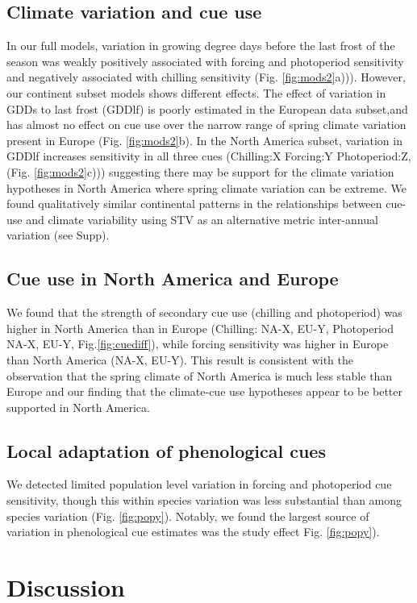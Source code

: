 \documentclass[12pt]{article}\usepackage[]{graphicx}\usepackage[]{color}
\begin{document}
\subsection*{Climate variation and cue use}
In our full models, variation in growing degree days before the last frost of the season was weakly positively associated with forcing and photoperiod sensitivity and negatively associated with chilling sensitivity (Fig. \ref{fig:mods2}a))). However, our continent subset models shows different effects. The effect of variation in GDDs to last frost (GDDlf) is poorly estimated in the European data subset,and has almost no effect on cue use over the narrow range of spring climate variation present in Europe  (Fig. \ref{fig:mods2}b). In the North America subset, variation in GDDlf increases sensitivity in all three cues (Chilling:X Forcing:Y Photoperiod:Z, (Fig. \ref{fig:mods2}c))) suggesting there may be support for the climate variation hypotheses in North America where spring climate variation can be extreme. We found qualitatively similar continental patterns in the relationships between cue-use and climate variability using STV as an alternative metric inter-annual variation (see Supp).

\subsection*{Cue use in North America and Europe}
We found that the strength of secondary cue use (chilling and photoperiod) was higher in North America than in Europe (Chilling: NA-X, EU-Y, Photoperiod NA-X, EU-Y, Fig.\ref{fig:cuediff}), while forcing sensitivity was higher in Europe than North America (NA-X, EU-Y). This result is consistent with the observation that the spring climate of North America is much less stable than Europe and our finding that the climate-cue use hypotheses appear to be better supported in North America.

\subsection*{Local adaptation of phenological cues}
We detected limited population level variation in forcing and photoperiod cue sensitivity, though this within species variation was less substantial than among species variation (Fig. \ref{fig:popy}). Notably, we found the largest source of variation in phenological cue estimates was the study effect Fig. \ref{fig:popy}).

\section*{Discussion}
\end{document}
